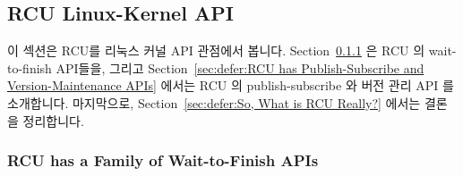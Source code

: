 
\subsection{RCU Linux-Kernel API}
\label{sec:defer:RCU Linux-Kernel API}

이 섹션은 RCU를 리눅스 커널 API 관점에서 봅니다.
Section~\ref{sec:defer:RCU has a Family of Wait-to-Finish APIs}
은 RCU 의 wait-to-finish API들을, 그리고
Section~\ref{sec:defer:RCU has Publish-Subscribe and Version-Maintenance APIs}
에서는 RCU 의 publish-subscribe 와 버전 관리 API 를 소개합니다.
마지막으로,
Section~\ref{sec:defer:So, What is RCU Really?}
에서는 결론을 정리합니다.
\iffalse

This section looks at RCU from the viewpoint of its Linux-kernel API.
Section~\ref{sec:defer:RCU has a Family of Wait-to-Finish APIs}
presents RCU's wait-to-finish APIs, and
Section~\ref{sec:defer:RCU has Publish-Subscribe and Version-Maintenance APIs}
presents RCU's publish-subscribe and version-maintenance APIs.
Finally,
Section~\ref{sec:defer:So, What is RCU Really?}
presents concluding remarks.
\fi

\subsubsection{RCU has a Family of Wait-to-Finish APIs}
\label{sec:defer:RCU has a Family of Wait-to-Finish APIs}

